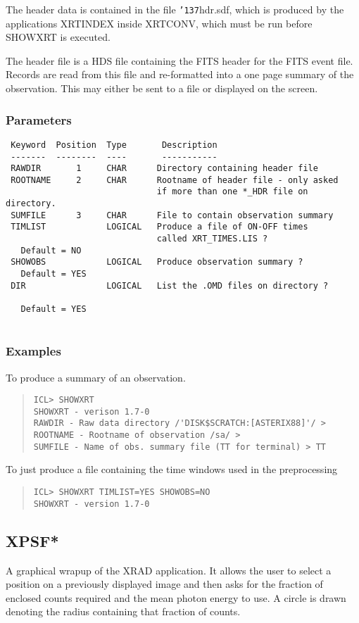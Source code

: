 \documentclass{book}
\renewcommand{\_}{{\tt\char'137}}     %
\begin{document}
The header data is contained in the file \_hdr.sdf, which is
produced by the applications XRTINDEX inside XRTCONV, which must
be run before SHOWXRT is executed.
 
The header file is a HDS file containing the FITS header for the
FITS event file. Records are read from this file and re-formatted
into a one page summary of the observation. This may either be sent
to a file or displayed on the screen.
 
\subsubsection{Parameters}
\begin{verbatim}
 Keyword  Position  Type       Description
 -------  --------  ----       -----------
 RAWDIR       1     CHAR      Directory containing header file
 ROOTNAME     2     CHAR      Rootname of header file - only asked
                              if more than one *_HDR file on directory.
 SUMFILE      3     CHAR      File to contain observation summary
 TIMLIST            LOGICAL   Produce a file of ON-OFF times
                              called XRT_TIMES.LIS ?
   Default = NO
 SHOWOBS            LOGICAL   Produce observation summary ?
   Default = YES
 DIR                LOGICAL   List the .OMD files on directory ?
 
   Default = YES
 
\end{verbatim}\subsubsection{Examples}
To produce a summary of an observation.
\begin{quote}\begin{verbatim}
ICL> SHOWXRT
SHOWXRT - verison 1.7-0
RAWDIR - Raw data directory /'DISK$SCRATCH:[ASTERIX88]'/ >
ROOTNAME - Rootname of observation /sa/ >
SUMFILE - Name of obs. summary file (TT for terminal) > TT
\end{verbatim}\end{quote}
To just produce a file containing the time windows used in the preprocessing
\begin{quote}\begin{verbatim}
ICL> SHOWXRT TIMLIST=YES SHOWOBS=NO
SHOWXRT - version 1.7-0
\end{verbatim}\end{quote}
\subsection{XPSF*}
A graphical wrapup of the XRAD application. It allows the user to
select a position on a previously displayed image and then asks for
the fraction of enclosed counts required and the mean photon energy
to use. A circle is drawn denoting the radius containing that fraction
of counts.
 
\end{document}
